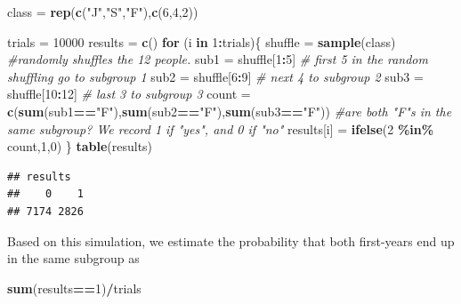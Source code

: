 \documentclass[
]{book}
\newenvironment{Shaded}{\begin{snugshade}}{\end{snugshade}}
\newcommand{\CommentTok}[1]{\textcolor[rgb]{0.56,0.35,0.01}{\textit{#1}}}
\newcommand{\ControlFlowTok}[1]{\textcolor[rgb]{0.13,0.29,0.53}{\textbf{#1}}}
\newcommand{\DecValTok}[1]{\textcolor[rgb]{0.00,0.00,0.81}{#1}}
\newcommand{\FunctionTok}[1]{\textcolor[rgb]{0.13,0.29,0.53}{\textbf{#1}}}
\newcommand{\NormalTok}[1]{#1}
\newcommand{\OtherTok}[1]{\textcolor[rgb]{0.56,0.35,0.01}{#1}}
\newcommand{\SpecialCharTok}[1]{\textcolor[rgb]{0.81,0.36,0.00}{\textbf{#1}}}
\newcommand{\StringTok}[1]{\textcolor[rgb]{0.31,0.60,0.02}{#1}}
\theoremstyle{definition}
\theoremstyle{definition}
\theoremstyle{definition}
\theoremstyle{definition}
\theoremstyle{remark}
\begin{document}
\begin{Shaded}
\begin{Highlighting}[]
\NormalTok{class }\OtherTok{=} \FunctionTok{rep}\NormalTok{(}\FunctionTok{c}\NormalTok{(}\StringTok{"J"}\NormalTok{,}\StringTok{"S"}\NormalTok{,}\StringTok{"F"}\NormalTok{),}\FunctionTok{c}\NormalTok{(}\DecValTok{6}\NormalTok{,}\DecValTok{4}\NormalTok{,}\DecValTok{2}\NormalTok{))}

\NormalTok{trials }\OtherTok{=} \DecValTok{10000}
\NormalTok{results }\OtherTok{=} \FunctionTok{c}\NormalTok{()}
\ControlFlowTok{for}\NormalTok{ (i }\ControlFlowTok{in} \DecValTok{1}\SpecialCharTok{:}\NormalTok{trials)\{}
\NormalTok{  shuffle }\OtherTok{=} \FunctionTok{sample}\NormalTok{(class) }\CommentTok{\#randomly shuffles the 12 people.}
\NormalTok{  sub1 }\OtherTok{=}\NormalTok{ shuffle[}\DecValTok{1}\SpecialCharTok{:}\DecValTok{5}\NormalTok{]  }\CommentTok{\# first 5 in the random shuffling go to subgroup 1}
\NormalTok{  sub2 }\OtherTok{=}\NormalTok{ shuffle[}\DecValTok{6}\SpecialCharTok{:}\DecValTok{9}\NormalTok{] }\CommentTok{\# next 4 to subgroup 2}
\NormalTok{  sub3 }\OtherTok{=}\NormalTok{ shuffle[}\DecValTok{10}\SpecialCharTok{:}\DecValTok{12}\NormalTok{] }\CommentTok{\# last 3 to subgroup 3}
\NormalTok{  count }\OtherTok{=} \FunctionTok{c}\NormalTok{(}\FunctionTok{sum}\NormalTok{(sub1}\SpecialCharTok{==}\StringTok{"F"}\NormalTok{),}\FunctionTok{sum}\NormalTok{(sub2}\SpecialCharTok{==}\StringTok{"F"}\NormalTok{),}\FunctionTok{sum}\NormalTok{(sub3}\SpecialCharTok{==}\StringTok{"F"}\NormalTok{))}
  \CommentTok{\#are both "F"s in the same subgroup? We record 1 if "yes", and 0 if "no"}
\NormalTok{  results[i] }\OtherTok{=} \FunctionTok{ifelse}\NormalTok{(}\DecValTok{2} \SpecialCharTok{\%in\%}\NormalTok{ count,}\DecValTok{1}\NormalTok{,}\DecValTok{0}\NormalTok{)}
\NormalTok{\}}
\FunctionTok{table}\NormalTok{(results)}
\end{Highlighting}
\end{Shaded}

\begin{verbatim}
## results
##    0    1 
## 7174 2826
\end{verbatim}

Based on this simulation, we estimate the probability that both first-years end up in the same subgroup as

\begin{Shaded}
\begin{Highlighting}[]
\FunctionTok{sum}\NormalTok{(results}\SpecialCharTok{==}\DecValTok{1}\NormalTok{)}\SpecialCharTok{/}\NormalTok{trials}
\end{Highlighting}
\end{Shaded}
\end{document}
